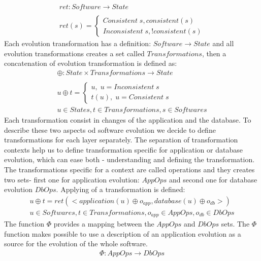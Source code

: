 \documentclass[11pt]{article}
\begin{document}
\begin{equation*}
\begin{gathered}
ret : Software \rightarrow State \\ \\
	ret(s) = \begin{cases}
 Consistent \; s, consistent(s)
 \\
 Inconsistent\;  s, ! consistent(s)
 \end{cases}
\end{gathered}
\end{equation*}
Each evolution transformation has a definition: $Software \rightarrow State$ and all evolution transformations creates a set called $Transformations$, then a concatenation of evolution transformation is defined as:
\begin{equation*}
\begin{gathered}
 \oplus : State \times Transformations \rightarrow State  \\ \\
 u \oplus t = \begin{cases}
 u, \; u = Inconsistent \; s \\
 t(u), \; u = Consistent \; s 
\end{cases}\\ 
u \in States, t \in Transformations, s \in Softwares
\end{gathered}
\end{equation*}
Each transformation consist in changes of the application and the database. To describe these two aspects od software evolution we decide to define transformations for each layer separately. The separation of transformation contexts help us to define transformation specific for application or database evolution, which can ease both - understanding and defining the transformation. The transformations specific for a context are called operations and they creates two sets- first one for application evolution: $AppOps$  and second one for database evolution $DbOps$. Applying of a transformation is defined:
\begin{gather*}
u \oplus t = ret(<application(u) \oplus o_{app}, database(u) \oplus o_{db}>) \\
u \in Softwares, t \in Transformations, o_{app} \in AppOps, o_{db} \in DbOps
\end{gather*}
The function $\Phi$ provides a mapping between the $AppOps$ and $DbOps$ sets. The $\Phi$ function makes possible to use a description of an application evolution as a source for the evolution of the whole software.
\begin{gather*}
\Phi : AppOps \rightarrow DbOps
\end{gather*}
\end{document}
